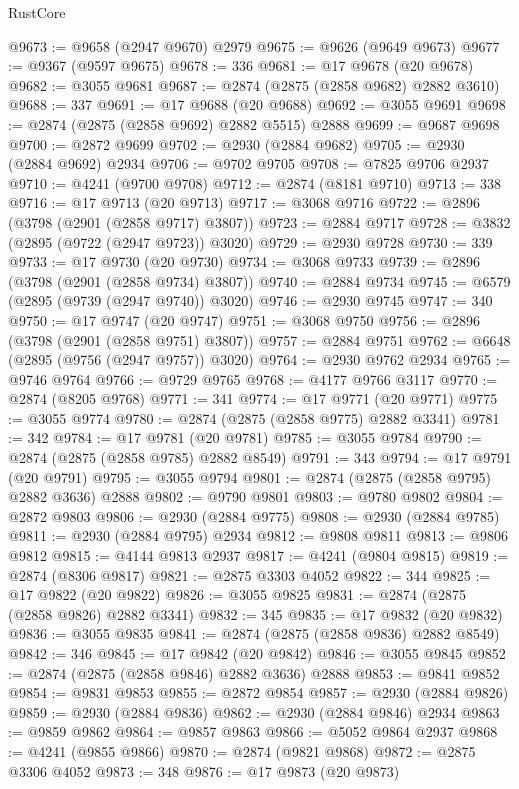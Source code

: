 \begin{lexlean}{RustCore}
\begin{coremodule}
@9673 := @9658 (@2947 @9670) @2979
@9675 := @9626 (@9649 @9673)
@9677 := @9367 (@9597 @9675)
@9678 := 336
@9681 := @17 @9678 (@20 @9678)
@9682 := @3055 @9681
@9687 := @2874 (@2875 (@2858 @9682) @2882 @3610)
@9688 := 337
@9691 := @17 @9688 (@20 @9688)
@9692 := @3055 @9691
@9698 := @2874 (@2875 (@2858 @9692) @2882 @5515) @2888
@9699 := @9687 @9698
@9700 := @2872 @9699
@9702 := @2930 (@2884 @9682)
@9705 := @2930 (@2884 @9692) @2934
@9706 := @9702 @9705
@9708 := @7825 @9706 @2937
@9710 := @4241 (@9700 @9708)
@9712 := @2874 (@8181 @9710)
@9713 := 338
@9716 := @17 @9713 (@20 @9713)
@9717 := @3068 @9716
@9722 := @2896 (@3798 (@2901 (@2858 @9717) @3807))
@9723 := @2884 @9717
@9728 := @3832 (@2895 (@9722 (@2947 @9723)) @3020)
@9729 := @2930 @9728
@9730 := 339
@9733 := @17 @9730 (@20 @9730)
@9734 := @3068 @9733
@9739 := @2896 (@3798 (@2901 (@2858 @9734) @3807))
@9740 := @2884 @9734
@9745 := @6579 (@2895 (@9739 (@2947 @9740)) @3020)
@9746 := @2930 @9745
@9747 := 340
@9750 := @17 @9747 (@20 @9747)
@9751 := @3068 @9750
@9756 := @2896 (@3798 (@2901 (@2858 @9751) @3807))
@9757 := @2884 @9751
@9762 := @6648 (@2895 (@9756 (@2947 @9757)) @3020)
@9764 := @2930 @9762 @2934
@9765 := @9746 @9764
@9766 := @9729 @9765
@9768 := @4177 @9766 @3117
@9770 := @2874 (@8205 @9768)
@9771 := 341
@9774 := @17 @9771 (@20 @9771)
@9775 := @3055 @9774
@9780 := @2874 (@2875 (@2858 @9775) @2882 @3341)
@9781 := 342
@9784 := @17 @9781 (@20 @9781)
@9785 := @3055 @9784
@9790 := @2874 (@2875 (@2858 @9785) @2882 @8549)
@9791 := 343
@9794 := @17 @9791 (@20 @9791)
@9795 := @3055 @9794
@9801 := @2874 (@2875 (@2858 @9795) @2882 @3636) @2888
@9802 := @9790 @9801
@9803 := @9780 @9802
@9804 := @2872 @9803
@9806 := @2930 (@2884 @9775)
@9808 := @2930 (@2884 @9785)
@9811 := @2930 (@2884 @9795) @2934
@9812 := @9808 @9811
@9813 := @9806 @9812
@9815 := @4144 @9813 @2937
@9817 := @4241 (@9804 @9815)
@9819 := @2874 (@8306 @9817)
@9821 := @2875 @3303 @4052
@9822 := 344
@9825 := @17 @9822 (@20 @9822)
@9826 := @3055 @9825
@9831 := @2874 (@2875 (@2858 @9826) @2882 @3341)
@9832 := 345
@9835 := @17 @9832 (@20 @9832)
@9836 := @3055 @9835
@9841 := @2874 (@2875 (@2858 @9836) @2882 @8549)
@9842 := 346
@9845 := @17 @9842 (@20 @9842)
@9846 := @3055 @9845
@9852 := @2874 (@2875 (@2858 @9846) @2882 @3636) @2888
@9853 := @9841 @9852
@9854 := @9831 @9853
@9855 := @2872 @9854
@9857 := @2930 (@2884 @9826)
@9859 := @2930 (@2884 @9836)
@9862 := @2930 (@2884 @9846) @2934
@9863 := @9859 @9862
@9864 := @9857 @9863
@9866 := @5052 @9864 @2937
@9868 := @4241 (@9855 @9866)
@9870 := @2874 (@9821 @9868)
@9872 := @2875 @3306 @4052
@9873 := 348
@9876 := @17 @9873 (@20 @9873)

\end{coremodule}
\end{lexlean}

